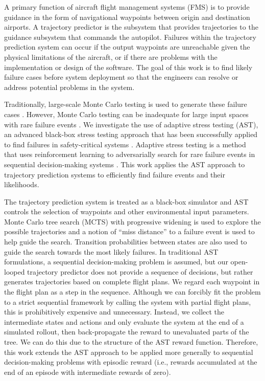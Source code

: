 A primary function of aircraft flight management systems (FMS) is to provide guidance in the form of navigational waypoints between origin and destination airports.
A trajectory predictor is the subsystem that provides trajectories to the guidance subsystem that commands the autopilot.
Failures within the trajectory prediction system can occur if the output waypoints are unreachable given the physical limitations of the aircraft, or if there are problems with the implementation or design of the software.
The goal of this work is to find likely failure cases before system deployment so that the engineers can resolve or address potential problems in the system. 

Traditionally, large-scale Monte Carlo testing is used to generate these failure cases \cite{monte_carlo}. However, Monte Carlo testing can be inadequate for large input spaces with rare failure events \cite{mc_limitations}.
We investigate the use of adaptive stress testing (AST), an advanced black-box stress testing approach that has been successfully applied to find failures in safety-critical systems \cite{lee2015adaptive,koren2018adaptive,lee2018differential,lee2019adaptive}. Adaptive stress testing is a method that uses reinforcement learning to adversarially search for rare failure events in sequential decision-making systems \cite{lee_thesis}. This work applies the AST approach to trajectory prediction systems to efficiently find failure events and their likelihoods.

The trajectory prediction system is treated as a black-box simulator and AST controls the selection of waypoints and other environmental input parameters.
Monte Carlo tree search (MCTS) with progressive widening is used to explore the possible trajectories and a notion of ``miss distance'' to a failure event is used to help guide the search.
Transition probabilities between states are also used to guide the search towards the most likely failures.
In traditional AST formulations, a sequential decision-making problem is assumed, but our open-looped trajectory predictor does not provide a sequence of decisions, but rather generates trajectories based on complete flight plans.
We regard each waypoint in the flight plan as a step in the sequence.
Although we can forcibly fit the problem to a strict sequential framework by calling the system with partial flight plans, this is prohibitively expensive and unnecessary.
Instead, we collect the intermediate states and actions and only evaluate the system at the end of a simulated rollout, then back-propagate the reward to unevaluated parts of the tree.
We can do this due to the structure of the AST reward function.
Therefore, this work extends the AST approach to be applied more generally to sequential decision-making problems with episodic reward (i.e., rewards accumulated at the end of an episode with intermediate rewards of zero).


